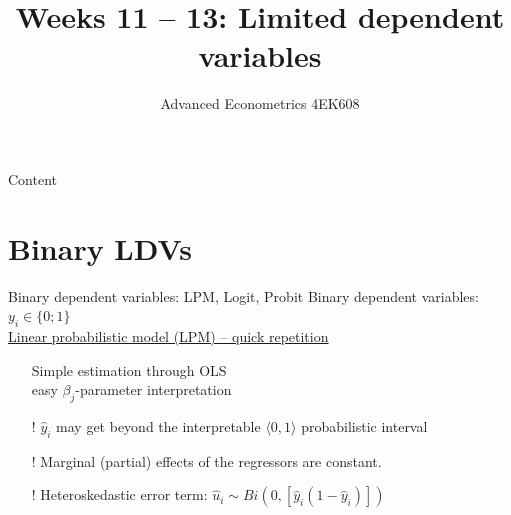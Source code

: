\documentclass[usenames,dvipsnames]{beamer}
\title[Week11]{Weeks 11 -- 13: Limited dependent variables}
\author{Advanced Econometrics 4EK608}
\institute{Vysoká škola ekonomická v Praze}
\date{}
\begin{document}
 
\begin{frame}
  \titlepage
\end{frame}

\begin{frame}{Content}
  \tableofcontents
\end{frame}

\section{Binary LDVs}
\begin{frame}{Binary dependent variables: LPM, Logit, Probit}
Binary dependent variables: $y_i \in \{0;1\}$\\
\vspace{1cm}
\underline{Linear probabilistic model (LPM) – quick repetition}\\
\bigskip
\begin{itemize}
\item[\checkmark] Simple estimation through OLS \\ easy $\beta_j$-parameter interpretation\\
\medskip
\item[!] $\hat{y}_i$ may get beyond the interpretable $\langle 0, 1 \rangle$ probabilistic interval\\
\smallskip
\item[!] Marginal (partial) effects of the regressors are constant. \\
\smallskip
\item[!] Heteroskedastic error term: $\hat{u}_i \sim Bi (0, [\hat{y}_i (1 - \hat{y}_i)])$
\end{itemize}
\end{frame}
\end{document}
